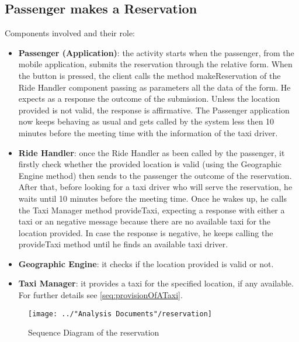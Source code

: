 \subsection{Passenger makes a Reservation}
Components involved and their role:
\begin{itemize}
	\item \textbf{Passenger (Application)}: the activity starts when the passenger, from the mobile application, submits the reservation through the relative form. When the button is pressed, the client calls the method makeReservation of the Ride Handler component passing as parameters all the data of the form. He expects as a response the outcome of the submission. Unless the location provided is not valid, the response is affirmative. The Passenger application now keeps behaving as usual and gets called by the system less then 10 minutes before the meeting time with the information of the taxi driver.
	\item \textbf{Ride Handler}: once the Ride Handler as been called by the passenger, it firstly check whether the provided location is valid (using the Geographic Engine method) then sends to the passenger the outcome of the reservation. After that, before looking for a taxi driver who will serve the reservation, he waits until 10 minutes before the meeting time. Once he wakes up, he calls the Taxi Manager method provideTaxi, expecting a response with either a taxi or an negative message because there are no available taxi for the location provided. In case the response is negative, he keeps calling the provideTaxi method until he finds an available taxi driver.
	\item \textbf{Geographic Engine}: it checks if the location provided is valid or not.
	\item \textbf{Taxi Manager}: it provides a taxi for the specified location, if any available. For further details see \ref{seq:provisionOfATaxi}.
\end{itemize}
\begin{figure}[H]
	\centering
	\texttt{[image: ../"Analysis Documents"/reservation]}
	\label{fig:reservation_seq}
	\caption{Sequence Diagram of the reservation}
\end{figure}

